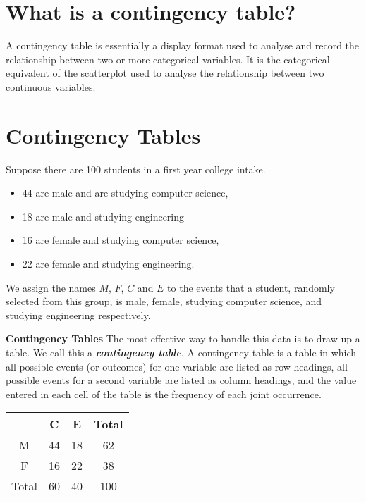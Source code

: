 \documentclass[]{report}
\begin{document}
	

\section{What is a contingency table?}




A contingency table is essentially a display format used to analyse and record the relationship between two or more categorical variables. It is the categorical equivalent of the scatterplot used to analyse the relationship between two continuous variables.

{
\section{Contingency Tables}
	Suppose there are 100 students in a first year college intake.  \begin{itemize} \item 44 are male and are studying computer science, \item 18 are male and studying engineering \item 16 are female and studying computer science, \item 22 are female and studying engineering. \end{itemize}
	
	We assign the names $M$, $F$, $C$ and $E$ to the events that a student, randomly selected from this group, is male, female, studying computer science, and studying engineering respectively.
}
{
	\textbf{Contingency Tables}
	The most effective way to handle this data is to draw up a table. We call this a \textbf{\emph{contingency table}}.
	A contingency table is a table in which all possible events (or outcomes) for one variable are listed as
	row headings, all possible events for a second variable are listed as column headings, and the value entered in
	each cell of the table is the frequency of each joint occurrence.
	
	
	\begin{center}
		\begin{tabular}{|c||c|c||c|}
			\hline
			& C & E & Total \\ \hline \hline
			M & 44 & 18 & 62 \\ \hline
			F & 16 & 22 & 38 \\ \hline \hline
			Total & 60 & 40 & 100 \\ \hline
		\end{tabular}
	\end{center}
	
}
\end{document}

